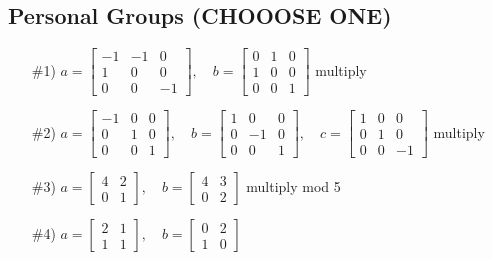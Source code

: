 \subsection{Personal Groups (CHOOOSE ONE)}
\begin{enumerate}
    \setlength{\itemsep}{5pt} %
    \item[\#1)] \( a = \begin{bmatrix} -1 & -1 & 0 \\ 1 & 0 & 0 \\ 0 & 0 & -1 \end{bmatrix}, \quad
                 b = \begin{bmatrix} 0 & 1 & 0 \\ 1 & 0 & 0 \\ 0 & 0 & 1 \end{bmatrix} \)
                 \quad multiply
    \item[\#2)] \( a = \begin{bmatrix} -1 & 0 & 0 \\ 0 & 1 & 0 \\ 0 & 0 & 1 \end{bmatrix}, \quad
                 b = \begin{bmatrix} 1 & 0 & 0 \\ 0 & -1 & 0 \\ 0 & 0 & 1 \end{bmatrix}, \quad
                 c = \begin{bmatrix} 1 & 0 & 0 \\ 0 & 1 & 0 \\ 0 & 0 & -1 \end{bmatrix} \)
                 \quad multiply
    \item[\#3)] \( a = \begin{bmatrix} 4 & 2 \\ 0 & 1 \end{bmatrix}, \quad
                 b = \begin{bmatrix} 4 & 3 \\ 0 & 2 \end{bmatrix} \)
                 \quad multiply mod 5
    \item[\#4)] \( a = \begin{bmatrix} 2 & 1 \\ 1 & 1 \end{bmatrix}, \quad
                 b = \begin{bmatrix} 0 & 2 \\ 1 & 0 \end{bmatrix} \)

\end{enumerate}
